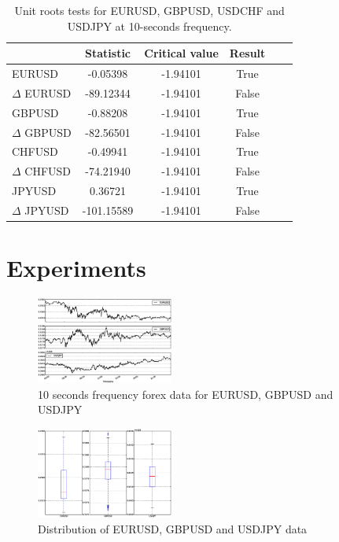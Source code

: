 \documentclass[twocolumn]{svjour3}          %
\begin{document}
\begin{table}[h!]
\label{tab:adf}
\begin{center}
\begin{tabular}{|l|c|c|c|c|c|}
\hline
& \textbf{Statistic} & \textbf{Critical value} & \textbf{Result}\\
\hline
EURUSD          &  -0.05398   & -1.94101 & True       \\
$\Delta$ EURUSD & -89.12344   & -1.94101 & False       \\
GBPUSD          &  -0.88208   & -1.94101 & True          \\
$\Delta$ GBPUSD & -82.56501   & -1.94101 & False       \\
CHFUSD          & -0.49941    & -1.94101 & True         \\
$\Delta$ CHFUSD & -74.21940   & -1.94101 & False       \\
JPYUSD          &  0.36721    & -1.94101 & True        \\
$\Delta$ JPYUSD & -101.15589  & -1.94101 & False     \\ 
\hline
\end{tabular}
\end{center}
\caption{Unit roots tests for EURUSD, GBPUSD, USDCHF and USDJPY at 10-seconds
frequency.}
\end{table}


\section{Experiments}

\begin{figure}[!ht]
  \centering
  \includegraphics[width=0.4\textwidth]{forexdata}
  \caption{10 seconds frequency forex data for EURUSD, GBPUSD and USDJPY}
  \label{fig:forexdata}
\end{figure}

\begin{figure}[!ht]
  \centering
  \includegraphics[width=0.4\textwidth]{distdata}
  \caption{Distribution of EURUSD, GBPUSD and USDJPY data}
  \label{fig:distdata}
\end{figure}
\end{document}
